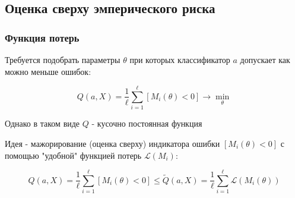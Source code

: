 \documentclass{beamer}
\begin{document}
	\subsection{Оценка сверху эмперического риска}
	
	\begin{frame}
		\frametitle{Функция потерь}
		Требуется подобрать параметры $\theta$ при которых классификатор $a$ допускает как можно меньше ошибок:
		
		\[
		Q(a, X) = \frac{1}{\ell} \sum_{i=1}^{\ell} [M_i(\theta) < 0] \rightarrow \min_{\theta}
		\]
		
		Однако в таком виде $Q$ - кусочно постоянная функция
		
		\vspace{15pt}
		
		Идея - мажорирование (оценка сверху) индикатора ошибки $[M_i(\theta) < 0]$ с помощью "удобной" функцией потерь $\mathcal{L}(M_i)$:
		
		\[
		Q(a, X) = \frac{1}{\ell} \sum_{i=1}^{\ell} [M_i(\theta) < 0]
		\le
		\widetilde{Q}(a, X) = \frac{1}{\ell} \sum_{i=1}^{\ell} \mathcal{L}(M_i(\theta))
		\]
	\end{frame}
	
\end{document}
